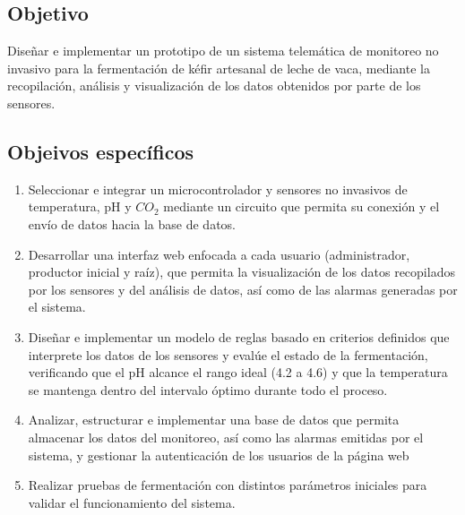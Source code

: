 \subsection{Objetivo}
Diseñar e implementar un prototipo de un sistema telemática de monitoreo no
invasivo para la fermentación de kéfir artesanal de leche de vaca, mediante la 
recopilación, análisis y visualización de los datos obtenidos por parte de los
sensores.
\subsection{Objeivos específicos}
\begin{enumerate}
    \item Seleccionar e integrar un microcontrolador y sensores no invasivos de
            temperatura, pH y $CO_{2}$ mediante un circuito que permita su conexión y el
            envío de datos hacia la base de datos.
    \item  Desarrollar una interfaz web enfocada a cada usuario (administrador,
            productor inicial y raíz), que permita la visualización de los datos recopilados
            por los sensores y del análisis de datos, así como de las alarmas generadas
            por el sistema.
    \item Diseñar e implementar un modelo de reglas basado en criterios definidos que
            interprete los datos de los sensores y evalúe el estado de la fermentación,
            verificando que el pH alcance el rango ideal (4.2 a 4.6) y que la temperatura
            se mantenga dentro del intervalo óptimo durante todo el proceso.
    \item Analizar, estructurar e implementar una base de datos que permita almacenar
            los datos del monitoreo, así como las alarmas emitidas por el sistema, y
            gestionar la autenticación de los usuarios de la página web
    \item Realizar pruebas de fermentación con distintos parámetros iniciales para
            validar el funcionamiento del sistema.
\end{enumerate}

